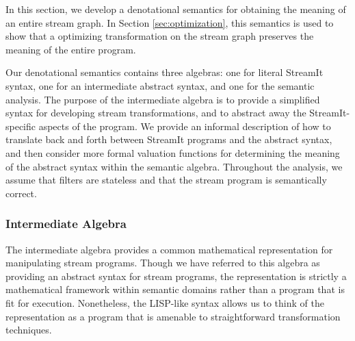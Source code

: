 In this section, we develop a denotational semantics for obtaining the
meaning of an entire stream graph.  In Section \ref{sec:optimization},
this semantics is used to show that a optimizing transformation on the
stream graph preserves the meaning of the entire program.

Our denotational semantics contains three algebras: one for literal
StreamIt syntax, one for an intermediate abstract syntax, and one for
the semantic analysis.  The purpose of the intermediate algebra is to
provide a simplified syntax for developing stream transformations, and
to abstract away the StreamIt-specific aspects of the program.  We
provide an informal description of how to translate back and forth
between StreamIt programs and the abstract syntax, and then consider
more formal valuation functions for determining the meaning of the
abstract syntax within the semantic algebra.  Throughout the analysis,
we assume that filters are stateless and that the stream program is
semantically correct.

\subsubsection{Intermediate Algebra}
\label{sec:intalgebra}

The intermediate algebra provides a common mathematical representation
for manipulating stream programs.  Though we have referred to this
algebra as providing an abstract syntax for stream programs, the
representation is strictly a mathematical framework within semantic
domains rather than a program that is fit for execution.  Nonetheless,
the LISP-like syntax allows us to think of the representation as a
program that is amenable to straightforward transformation techniques.

